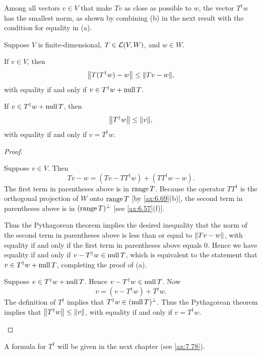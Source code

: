 Among all vectors $v\in V$ that make $Tv$ as close as possible to $w$, the
vector $T^\dagger w$ has the smallest norm, as shown by combining (b) in the
next result with the condition for equality in (a).

\begin{result}\label{ax:6.70}
Suppose $V$ is finite-dimensional, $T\in\mathcal{L}(V,W)$, and $w\in W$.
\begin{parts}
\item If $v\in V$, then
  \[ \bigl\lVert T(T^\dagger w)-w\bigr\rVert \le \lVert Tv-w \rVert, \]
  with equality if and only if $v\in T^\dagger w+\operatorname{null} T$.
\item If $v\in T^\dagger w+\operatorname{null} T$, then
  \[ \bigl\lVert T^\dagger w\bigr\rVert \le \lVert v \rVert, \]
  with equality if and only if $v=T^\dagger w$.
\end{parts}
\end{result}

\begin{proof}\leavevmode
\begin{parts}
\item Suppose $v\in V$. Then
  \[ Tv-w = (Tv-TT^\dagger w)+(TT^\dagger w-w). \]
  The first term in parentheses above is in $\operatorname{range} T$. Because the operator
  $TT^\dagger$ is the orthogonal projection of $W$ onto $\operatorname{range} T$ [by
  \ref{ax:6.69}(b)], the second term in parentheses above is in
  $(\operatorname{range} T)^\perp$ [see \ref{ax:6.57}(f)].

  Thus the Pythagorean theorem implies the desired inequality that the norm of
  the second term in parentheses above is less than or equal to
  $\lVert Tv-w \rVert$, with equality if and only if the first term in parentheses
  above equals $0$. Hence we have equality if and only if
  $v-T^\dagger w\in\operatorname{null} T$, which is equivalent to the statement that
  $v\in T^\dagger w+\operatorname{null} T$, completing the proof of (a).
\item Suppose $v\in T^\dagger w+\operatorname{null} T$. Hence $v-T^\dagger w\in\operatorname{null} T$. Now
  \[ v = (v-T^\dagger w)+T^\dagger w. \]
  The definition of $T^\dagger$ implies that $T^\dagger w\in(\operatorname{null} T)^\perp$.
  Thus the Pythagorean theorem implies that
  $\bigl\lVert T^\dagger w\bigr\rVert\le\lVert v \rVert$, with equality if and only
  if $v=T^\dagger w$. \qedhere
\end{parts}
\end{proof}

A formula for $T^\dagger$ will be given in the next chapter (see
\ref{ax:7.78}).


